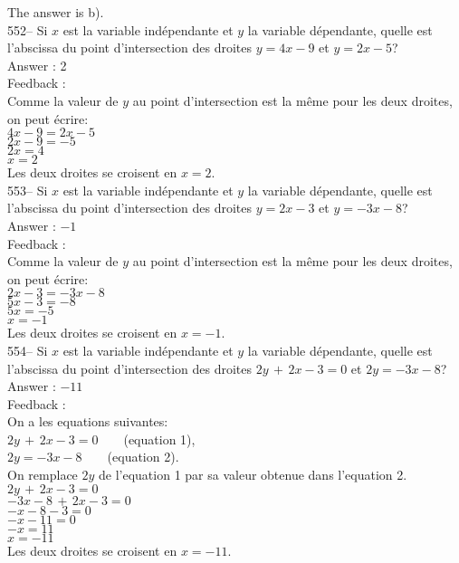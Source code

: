 ﻿\documentclass[letterpaper, 12pt]{article}
\begin{document}
The answer is b).\\


552-- Si $x$ est la variable ind\'ependante et $y$ la variable d\'ependante,
quelle est l'abscissa du point d'intersection des droites $y=4x-9$ et
$y=2x-5$?\\

Answer : 2\\

Feedback : \\
Comme la valeur de $y$ au point d'intersection est la m\^eme pour les deux
droites, on peut \'ecrire:\\
$4x-9=2x-5$\\
$2x-9=-5$\\
$2x=4$\\
$x=2$\\

Les deux droites se croisent en $x=2$.\\

553-- Si $x$ est la variable ind\'ependante et $y$ la variable d\'ependante,
quelle est l'abscissa du point d'intersection des droites $y=2x-3$ et
$y=-3x-8$?\\

Answer : $-1$\\

Feedback : \\
Comme la valeur de $y$ au point d'intersection est la m\^eme pour les deux
droites, on peut \'ecrire:\\
$2x-3=-3x-8$\\
$5x-3=-8$\\
$5x=-5$\\
$x=-1$\\

Les deux droites se croisent en $x=-1$.\\

554-- Si $x$ est la variable ind\'ependante et $y$ la variable d\'ependante,
quelle est l'abscissa du point d'intersection des droites $2y\,+\,2x-3=0$ et
$2y=-3x-8$?\\

Answer : $-11$\\

Feedback : \\
On a les equations suivantes:\\
$2y\,+\,2x-3=0  \qquad $(equation 1),\\
$2y=-3x-8  \qquad $(equation 2).\\

On remplace $2y$ de l'equation 1 par sa valeur obtenue dans l'equation
2.\\
$2y\,+\,2x-3=0$\\
$-3x-8\,+\,2x-3=0$\\
$-x-8-3=0$\\
$-x-11=0$\\
$-x=11$\\
$x=-11$\\
Les deux droites se croisent en $x=-11$.\\
\end{document}
